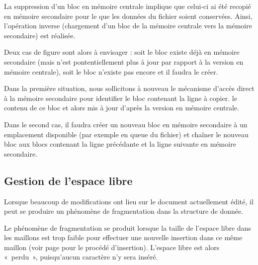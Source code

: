 La suppression d'un bloc en mémoire centrale implique que celui-ci ai été
recopié en mémoire secondaire pour le que les données du fichier soient
conservées. Ainsi, l'opération inverse (chargement d'un bloc de la mémoire
centrale vers la mémoire secondaire) est réalisée.

Deux cas de figure sont alors à envisager : soit le bloc existe déjà en mémoire
secondaire (mais n'est pontentiellement plus à jour par rapport à la version en
mémoire centrale), soit le bloc n'existe pas encore et il faudra le créer.

Dans la première situation, nous sollicitons à nouveau le mécanisme d'accès
direct à la mémoire secondaire pour identifier le bloc contenant la ligne à
copier. le contenu de ce bloc et alors mis à jour d'après la version en mémoire
centrale.

Dans le second cas, il faudra créer un nouveau bloc en mémoire secondaire à un
emplacement disponible (par exemple en queue du fichier) et chaîner le nouveau
bloc aux blocs contenant la ligne précédante et la ligne suivante en mémoire
secondaire.


\subsection{Gestion de l'espace libre}
	\label{subsec:gestionespacelibre}
Lorsque beaucoup de modifications ont lieu sur le document actuellement édité,
il peut se produire un phénomène de fragmentation dans la structure de
donnée.

Le phénomène de fragmentation se produit lorsque la taille de l'espace libre
dans les maillons est trop faible pour effectuer une nouvelle insertion dans ce
même maillon (voir page \pageref{sec:structurationligne} pour le procédé
d'insertion). L'espace libre est alors «~perdu~», puisqu'aucun caractère n'y
sera inséré.

